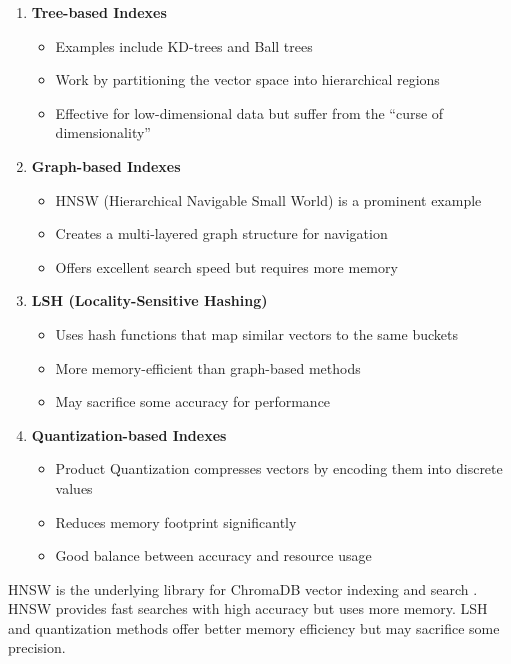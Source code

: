 \begin{enumerate}
    \item \textbf{Tree-based Indexes}
    \begin{itemize}
        \item Examples include KD-trees and Ball trees
        \item Work by partitioning the vector space into hierarchical regions  
        \item Effective for low-dimensional data but suffer from the ``curse of dimensionality''
    \end{itemize}

    \item \textbf{Graph-based Indexes}
    \begin{itemize}
        \item HNSW (Hierarchical Navigable Small World) is a prominent example
        \item Creates a multi-layered graph structure for navigation
        \item Offers excellent search speed but requires more memory
    \end{itemize}

    \item \textbf{LSH (Locality-Sensitive Hashing)}
    \begin{itemize}
        \item Uses hash functions that map similar vectors to the same buckets
        \item More memory-efficient than graph-based methods
        \item May sacrifice some accuracy for performance
    \end{itemize}

    \item \textbf{Quantization-based Indexes}
    \begin{itemize}
        \item Product Quantization compresses vectors by encoding them into discrete values
        \item Reduces memory footprint significantly
        \item Good balance between accuracy and resource usage
    \end{itemize}
\end{enumerate}
HNSW is the underlying library for ChromaDB vector indexing and search . HNSW provides fast searches with high accuracy but uses more memory. LSH and quantization methods offer better memory efficiency but may sacrifice some precision.

